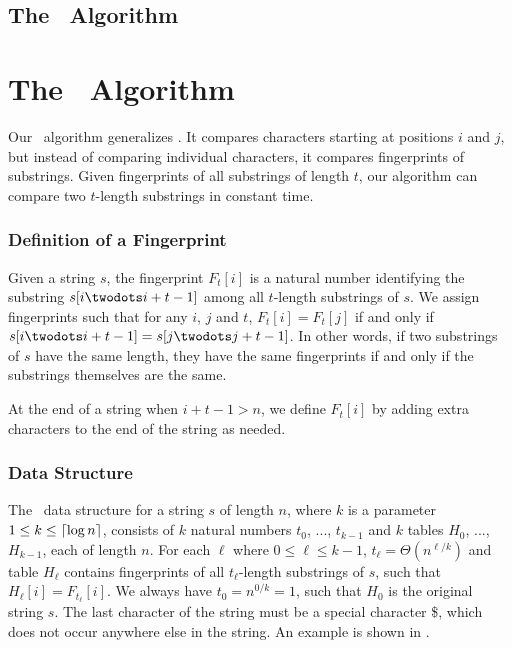 \documentclass[a4]{article}
\newcommand*{\pref}{\prettyref}
\begin{document}
\subsection{The \fprintk\ Algorithm}

\fi %

\ifarticle
\section{The \fprintk\ Algorithm}
\fi %

Our \fprintk\ algorithm generalizes . It compares characters starting at positions $i$ and $j$, but instead of comparing individual characters, it compares fingerprints of substrings. Given fingerprints of all substrings of length $t$, our algorithm can compare two $t$-length substrings in constant time.

\subsubsection{Definition of a Fingerprint}

Given a string $s$, the fingerprint $F_t[i]$ is a natural number identifying the substring $s[i\twodots i+t-1]$ among all $t$-length substrings of $s$. We assign fingerprints such that for any $i$, $j$ and $t$, $F_t[i] = F_t[j]$ if and only if $s[i\twodots i+t-1] = s[j\twodots j+t-1]$. In other words, if two substrings of $s$ have the same length, they have the same fingerprints if and only if the substrings themselves are the same.

At the end of a string when $i+t-1>n$, we define $F_t[i]$ by adding extra characters to the end of the string as needed.

\subsubsection{Data Structure\label{sec:fingerprint-ds}}

The \fprintk\ data structure for a string $s$ of length $n$, where $k$ is a parameter $1 \leq k \leq \lceil\log n\rceil$, consists of $k$ natural numbers $t_0$, ..., $t_{k-1}$ and $k$ tables $H_0$, ..., $H_{k-1}$, each of length $n$. For each $\ell$ where $0\leq \ell\leq k-1$, $t_\ell = \Theta(n^{\ell/k})$ and table $H_\ell$ contains fingerprints of all $t_\ell$-length substrings of $s$, such that $H_\ell[i] = F_{t_\ell}[i]$. We always have $t_0 = n^{0/k} = 1$, such that $H_0$ is the original string $s$. The last character of the string must be a special character \$, which does not occur anywhere else in the string. An example is shown in \pref{fig:fingerprint-ds}.
\end{document}

